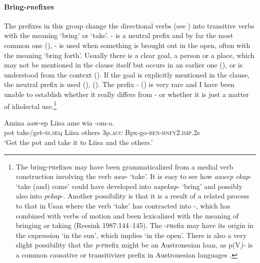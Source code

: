 \paragraph[Bring-\textsc{pr}efixes]{Bring-\textsc{pr}efixes}
{}
The prefixes in this group change the directional verbs (see ) into transitive verbs with the meaning `bring' or `take'. \nobreakdash- is a neutral prefix and by far the most common one (), \nobreakdash- is used when something is brought out in the open, often with the meaning `bring forth'. Usually there is a clear goal, a person or a place, which may not be mentioned in the clause itself but occurs in an earlier one (), or is understood from the context (). If the goal is explicitly mentioned in the clause, the neutral prefix is used (), (). The prefix \nobreakdash- () is very rare and I have been unable to establish whether it really differs from \nobreakdash- or whether it is just a matter of idiolectal use.\footnote{The bring\nobreakdash-\textsc{pr}efixes may have been grammaticalized from a medial verb construction involving the verb \textit{aaw}\nobreakdash- `take'. It is easy to see how \textit{aawep ekap}\nobreakdash- `take (and) come' could have developed into \textit{aapekap}\nobreakdash- `bring' and possibly also into \textit{pekap}-. Another possibility is that it is a result of a related process to that in Usan where the verb  `take' has contracted into \nobreakdash-, which has combined with verbs of motion and been lexicalized with the meaning of bringing or taking ({Reesink 1987}:144--145). The \nobreakdash-\textsc{pr}efix may have its origin in the expression  `in the sun', which implies `in the open'. There is also a very slight possibility that the \textit{p}\nobreakdash-\textsc{pr}efix might be an Austronesian loan, as p(V\textit{)\nobreakdash-} is a common causative or transitivizer prefix in Austronesian languages \citep[61]{Bugenhagen1995}. }

\ea%
\label{ex:x221}
\gll Amina aaw-ep Liisa ame wia -om-a.\\
pot take/get-\textsc{ss}.\textsc{seq} Liisa others 3p.\textsc{acc} Bpx-go-\textsc{ben}-\textsc{bnfy}2.\textsc{imp}.2s\\
\glt`Get the pot and take it to Liisa and the others.' 
\z

